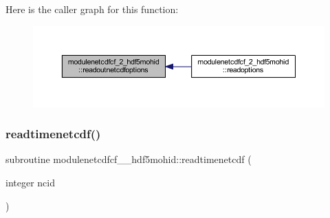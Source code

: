 Here is the caller graph for this function\+:\nopagebreak
\begin{figure}[H]
\begin{center}
\leavevmode
\includegraphics[width=350pt]{namespacemodulenetcdfcf__2__hdf5mohid_ae51ef08c6aac5023d3661f6ec659119a_icgraph}
\end{center}
\end{figure}
\mbox{\label{namespacemodulenetcdfcf__2__hdf5mohid_a734d453ab8aa9e07adc4f367336f1875}} 
\subsubsection{\texorpdfstring{readtimenetcdf()}{readtimenetcdf()}}
{\footnotesize\ttfamily subroutine modulenetcdfcf\+\_\+\_\+hdf5mohid\+::readtimenetcdf (\begin{DoxyParamCaption}\item[{integer}]{ncid }\end{DoxyParamCaption})\hspace{0.3cm}{\ttfamily [private]}}

